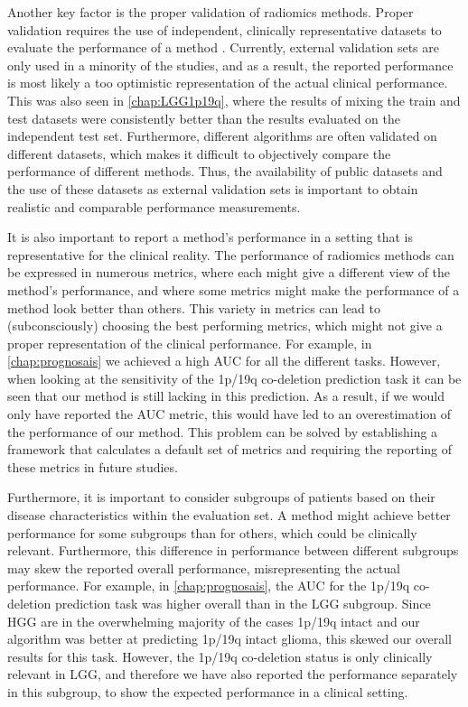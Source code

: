 Another key factor is the proper validation of radiomics methods.
Proper validation requires the use of independent, clinically representative datasets to evaluate the performance of a method \autocite{gillies2016radiomics, rizzo2018radiomics, lohmann2020radiomics, yip2016applicationsradiomics}.
Currently, external validation sets are only used in a minority of the studies, and as a result, the reported performance is most likely a too optimistic representation of the actual clinical performance.
This was also seen in \cref{chap:LGG1p19q}, where the results of mixing the train and test datasets were consistently better than the results evaluated on the independent test set.
Furthermore, different algorithms are often validated on different datasets, which makes it difficult to objectively compare the performance of different methods.
Thus, the availability of public datasets and the use of these datasets as external validation sets is important to obtain realistic and comparable performance measurements.

It is also important to report a method's performance in a setting that is representative for the clinical reality.
The performance of radiomics methods can be expressed in numerous metrics, where each might give a different view of the method's performance, and where some metrics might make the performance of a method look better than others.
This variety in metrics can lead to (subconsciously) choosing the best performing metrics, which might not give a proper representation of the clinical performance.
For example, in \cref{chap:prognosais} we achieved a high \gls{AUC} for all the different tasks.
However, when looking at the sensitivity of the 1p/19q co-deletion prediction task it can be seen that our method is still lacking in this prediction.
As a result, if we would only have reported the \gls{AUC} metric, this would have led to an overestimation of the performance of our method.
This problem can be solved by establishing a framework that calculates a default set of metrics and requiring the reporting of these metrics in future studies.


Furthermore, it is important to consider subgroups of patients based on their disease characteristics within the evaluation set.
A method might achieve better performance for some subgroups than for others, which could be clinically relevant.
Furthermore, this difference in performance between different subgroups may skew the reported overall performance, misrepresenting the actual performance.
For example, in \cref{chap:prognosais}, the \gls{AUC} for the 1p/19q co-deletion prediction task was higher overall than in the \gls{LGG} subgroup.
Since \gls{HGG} are in the overwhelming majority of the cases 1p/19q intact and our algorithm was better at predicting 1p/19q intact glioma, this skewed our overall results for this task.
However, the 1p/19q co-deletion status is only clinically relevant in \gls{LGG}, and therefore we have also reported the performance separately in this subgroup, to show the expected performance in a clinical setting.


